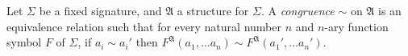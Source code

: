 \documentclass[12pt]{article}
\newcommand{\A}{\mathfrak{A}}
\begin{document}
Let $\Sigma$ be a fixed signature, and $\A$ a structure for $\Sigma$. A \emph{congruence} $\sim$ on $\A$ is an equivalence relation such that for every natural number $n$ and $n$-ary function symbol $F$ of $\Sigma$, if \(a_i \sim a_i'\) then \(F^\A(a_1, \ldots a_n) \sim F^\A(a_1', \ldots a_n').\)
\end{document}
